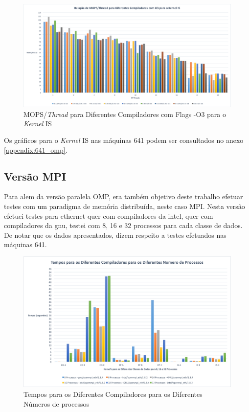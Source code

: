 \documentclass[conference,compsoc]{IEEEtran}
\begin{document}
\begin{figure}[h!]
\centering
\includegraphics[scale=0.225]{OMP/mops-thread_dif_comp-O3_IS_nodo-431.png}
\caption{MOPS/\textit{Thread} para Diferentes Compiladores com Flags -O3 para o \textit{Kernel} IS}
\label{fig:mops-thread_dif_comp_omp_O3_IS_431}
\end{figure}

Os gráficos para o \textit{Kernel} IS nas máquinas 641 podem ser consultados no anexo \ref{appendix:641_omp}.

\subsection{Versão MPI}
Para alem da versão paralela OMP, era também objetivo deste trabalho efetuar testes com um paradigma de memória distribuída, neste caso MPI. Nesta versão efetuei testes para ethernet quer com compiladores da intel, quer com compiladores da gnu, testei com 8, 16 e 32 processos para cada classe de dados. De notar que os dados apresentados, dizem respeito a testes efetuados nas máquinas 641.

\begin{figure}[h!]
\centering
\includegraphics[scale=0.325]{MPI/tempos_dif_compiladores_dif_num_proc.png}
\caption{Tempos para os Diferentes Compiladores para os Diferentes Números de processos}
\label{fig:tempo_mpi_eth}
\end{figure}
\end{document}
